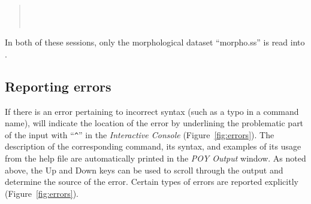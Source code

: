 {\begin{quote}
 	 \\
	 \\
\end{quote}

In both of these sessions, only the morphological dataset ``morpho.ss'' is read into \poy.

\subsection{Reporting errors}
If there is an error pertaining to incorrect syntax (such as a typo in a command name), \poy will indicate the location of the error by underlining the problematic part of the input with ``\texttt{\^}'' in the \emph{Interactive Console} (Figure~\ref{fig:errors}). The description of the corresponding command, its syntax, and examples of its usage from the help file are automatically printed in the \emph{POY Output} window. As noted above, the Up and Down keys can be used to scroll through the output and determine the source of the error. Certain types of errors are reported explicitly (Figure~\ref{fig:errors}).

}
